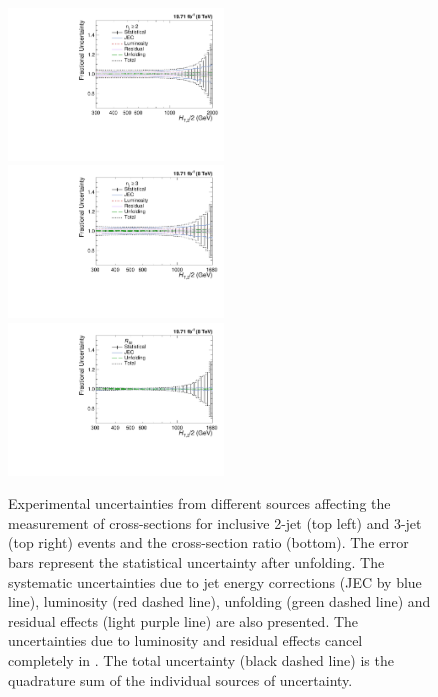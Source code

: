 \begin{figure}[!h]
 \begin{center}
 \hspace*{-3mm}\includegraphics[width=0.51\textwidth]{Plots_HT_2_150/Total_unc_all_2_NLO_add.pdf}%
 ~~\includegraphics[width=0.51\textwidth]{Plots_HT_2_150/Total_unc_all_3_NLO_add.pdf}\\
 \includegraphics[width=0.51\textwidth]{Plots_HT_2_150/Total_Unc_ratio_32_direct_add.pdf}
 \caption[Experimental uncertainties from different sources affecting the measurement of cross-sections and the cross-section ratio.]{Experimental uncertainties from different sources affecting the measurement of cross-sections for inclusive 2-jet (top left) and 3-jet (top right) events and the cross-section ratio \ratio (bottom). The error bars represent the statistical uncertainty after unfolding. The systematic uncertainties due to jet energy corrections (JEC by blue line), luminosity (red dashed line), unfolding (green dashed line) and residual effects (light purple line) are also presented. The uncertainties due to luminosity and residual effects cancel completely in \ratio. The total uncertainty (black dashed line) is the quadrature sum of the individual sources of uncertainty.}
 \label{fig:exp_unc}
 \end{center}
\end{figure}

